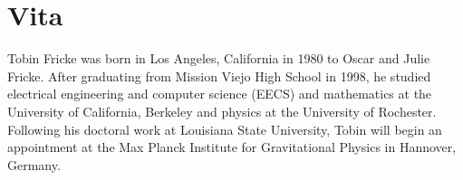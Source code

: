 \chapter*{Vita}

Tobin Fricke was born in Los Angeles, California in 1980 to Oscar and
Julie Fricke.  After graduating from Mission Viejo High School in
1998, he studied electrical engineering and computer science (EECS)
and mathematics at the University of California, Berkeley and physics
at the University of Rochester.  Following his doctoral work at
Louisiana State University, Tobin will begin an appointment at the Max
Planck Institute for Gravitational Physics in Hannover, Germany.
